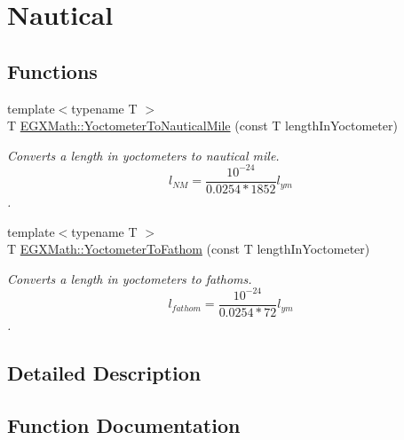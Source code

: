 \hypertarget{group___e_g_x_math-_conversions-_length_conversions-_yoctometer-_nautical}{}\section{Nautical}
\label{group___e_g_x_math-_conversions-_length_conversions-_yoctometer-_nautical}
\subsection*{Functions}
\begin{DoxyCompactItemize}
\item 
{\footnotesize template$<$typename T $>$ }\\T \mbox{\hyperlink{group___e_g_x_math-_conversions-_length_conversions-_yoctometer-_nautical_gae49dab08f77667adbef6d419339a54c0}{E\+G\+X\+Math\+::\+Yoctometer\+To\+Nautical\+Mile}} (const T length\+In\+Yoctometer)
\begin{DoxyCompactList}\small\item\em Converts a length in yoctometers to nautical mile. \[ l_{NM}= \frac{10^{-24}}{0.0254 * 1852} l_{ym} \]. \end{DoxyCompactList}\item 
{\footnotesize template$<$typename T $>$ }\\T \mbox{\hyperlink{group___e_g_x_math-_conversions-_length_conversions-_yoctometer-_nautical_gae0ed365ad4fa316377b2054b86012240}{E\+G\+X\+Math\+::\+Yoctometer\+To\+Fathom}} (const T length\+In\+Yoctometer)
\begin{DoxyCompactList}\small\item\em Converts a length in yoctometers to fathoms. \[ l_{fathom}= \frac{10^{-24}}{0.0254 * 72} l_{ym} \]. \end{DoxyCompactList}\end{DoxyCompactItemize}


\subsection{Detailed Description}


\subsection{Function Documentation}
\mbox{\label{group___e_g_x_math-_conversions-_length_conversions-_yoctometer-_nautical_gae0ed365ad4fa316377b2054b86012240}} 
